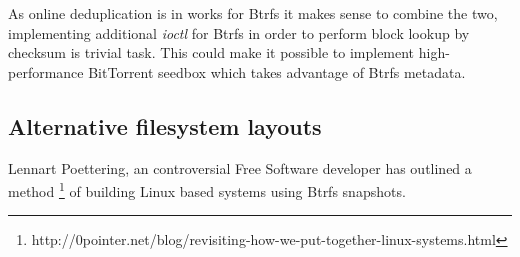 \documentclass{article}
\begin{document}
As online deduplication is in works for Btrfs it makes sense to combine the two,
implementing additional \emph{ioctl} for Btrfs in order to perform block lookup
by checksum is trivial task.
This could make it possible to implement high-performance BitTorrent seedbox
which takes advantage of Btrfs metadata.

\subsection{Alternative filesystem layouts}

Lennart Poettering, an controversial Free Software developer has outlined a method
\footnote{http://0pointer.net/blog/revisiting-how-we-put-together-linux-systems.html}
of building Linux based systems using Btrfs snapshots.



\end{document}
